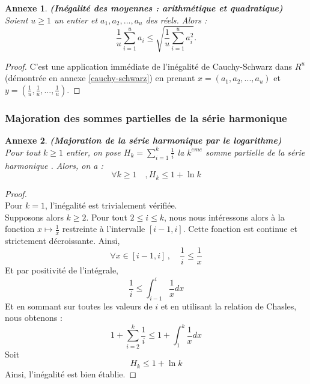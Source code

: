 \documentclass[12pt,a4paper]{book}
\newtheorem{annexe}{Annexe}
\newcommand{\1}{\mathds{1}}
\begin{document}
	\begin{annexe} \label{innegalite_moyenne}
		\textbf{(Inégalité des moyennes : arithmétique et quadratique)}\\
		Soient $u \geq 1$ un entier et $a_1, a_2, ..., a_u$ des réels. Alors :
		$$
			\frac{1}{u} \sum_{i=1}^{u} a_i \leq \sqrt{\frac{1}{u} \sum_{i=1}^{u} a_i^2}.
		$$
	\end{annexe}
	
	\begin{proof}
		C'est une application immédiate de l'inégalité de Cauchy-Schwarz dans $R^u$ (démontrée en annexe \ref{cauchy-schwarz}) en prenant $x=(a_1, a_2, ..., a_u)$ et $y= \left( \frac{1}{u},\frac{1}{u}, ..., \frac{1}{u} \right)$.
	\end{proof}

\subsubsection{Majoration des sommes partielles de la série harmonique}

	\begin{annexe} \label{majoration_serie_harmonique}
		\textbf{(Majoration de la série harmonique par le logarithme)}\\
		Pour tout $k \geq 1$ entier, on pose $H_k = \displaystyle \sum_{i=1}^{k} \frac{1}{i}$ la $k^{\grave{e}me}$ somme partielle de la série harmonique . Alors, on a :
		$$
			\forall k \geq 1 \quad, H_{k} \leq 1 + \ln k
		$$
	\end{annexe}
	
	\begin{proof}
		~\\
		Pour $k=1$, l'inégalité est trivialement vérifiée.\\
		Supposons alors $k \geq 2$. Pour tout $2 \leq i \leq k$, nous nous intéressons alors à la fonction $x \longmapsto \frac{1}{x}$ restreinte à l'intervalle $[i-1,i]$. Cette fonction est continue et strictement décroissante. Ainsi,
		$$
			\forall x \in [i-1,i] \,, \quad \frac{1}{i} \leq \frac{1}{x}
		$$
		Et par positivité de l'intégrale,
		$$
			\frac{1}{i} \leq \int_{i-1}^i \frac{1}{x}dx
		$$
		Et en sommant sur toutes les valeurs de $i$ et en utilisant la relation de Chasles, nous obtenons :
		$$
			1+\sum_{i=2}^k \frac{1}{i} \leq 1 + \int_1^k \frac{1}{x}dx
		$$
		Soit
		$$
			H_k \leq 1 + \ln k
		$$
		Ainsi, l'inégalité est bien établie.
	\end{proof}

\end{document}

